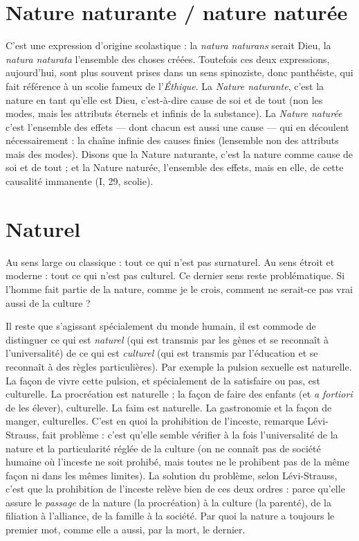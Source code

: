 \section{Nature naturante / nature naturée}
C’est une expression d’origine scolastique : la {\it natura
naturans} serait Dieu, la {\it natura naturata} l'ensemble des choses créées. Toutefois
ces deux expressions, aujourd’hui, sont plus souvent prises dans un sens spinoziste,
donc panthéiste, qui fait référence à un scolie fameux de l’{\it Éthique}. La
{\it Nature naturante}, c’est la nature en tant qu’elle est Dieu, c’est-à-dire cause de
soi et de tout (non les modes, mais les attributs éternels et infinis de la substance).
La {\it Nature naturée} c’est l’ensemble des effets — dont chacun est aussi une
cause — qui en découlent nécessairement : la chaîne infinie des causes finies
(lensemble non des attributs mais des modes). Disons que la Nature naturante,
c’est la nature comme cause de soi et de tout ; et la Nature naturée,
l’ensemble des effets, mais en elle, de cette causalité immanente (I, 29, scolie).

\section{Naturel}
Au sens large ou classique : tout ce qui n’est pas surnaturel. Au
sens étroit et moderne : tout ce qui n’est pas culturel. Ce dernier
sens reste problématique. Si l’homme fait partie de la nature, comme je le crois,
comment ne serait-ce pas vrai aussi de la culture ?

Il reste que s’agissant spécialement du monde humain, il est commode de
distinguer ce qui est {\it naturel} (qui est transmis par les gènes et se reconnaît à
l’universalité) de ce qui est {\it culturel} (qui est transmis par l'éducation et se reconnaît
à des règles particulières). Par exemple la pulsion sexuelle est naturelle. La
façon de vivre cette pulsion, et spécialement de la satisfaire ou pas, est culturelle.
La procréation est naturelle ; la façon de faire des enfants (et {\it a fortiori} de
les élever), culturelle. La faim est naturelle. La gastronomie et la façon de
manger, culturelles. C’est en quoi la prohibition de l'inceste, remarque Lévi-Strauss,
fait problème : c’est qu’elle semble vérifier à la fois l’universalité de la
nature et la particularité réglée de la culture (on ne connaît pas de société
humaine où l'inceste ne soit prohibé, mais toutes ne le prohibent pas de la
même façon ni dans les mêmes limites). La solution du problème, selon Lévi-Strauss,
c’est que la prohibition de l'inceste relève bien de ces deux ordres :
parce qu’elle assure le {\it passage} de la nature (la procréation) à la culture (la
parenté), de la filiation à l'alliance, de la famille à la société. Par quoi la nature
a toujours le premier mot, comme elle a aussi, par la mort, le dernier.

